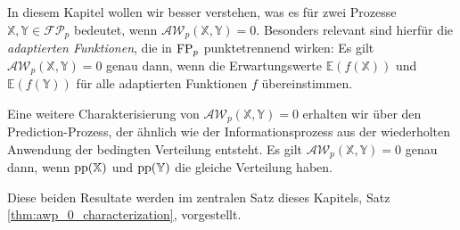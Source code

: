 In diesem Kapitel wollen wir besser verstehen, was es für zwei Prozesse $\mathbb{X,Y} \in \mathcal{FP}_p$ bedeutet, wenn $\mathcal{AW}_p(\mathbb{X,Y}) = 0$. Besonders relevant sind hierfür die \emph{adaptierten Funktionen}, die in $\operatorname{FP}_p$ punktetrennend wirken: Es gilt $\mathcal{AW}_p(\mathbb{X,Y})=0$ genau dann, wenn die Erwartungswerte $\mathbb{E}(f(\mathbb{X}))$ und $\mathbb{E}(f(\mathbb{Y}))$ für alle adaptierten Funktionen $f$ übereinstimmen. 

Eine weitere Charakterisierung von $\mathcal{AW}_p(\mathbb{X,Y})=0$ erhalten wir über den \\ 
Prediction-Prozess, der ähnlich wie der Informationsprozess aus der wiederholten Anwendung der bedingten Verteilung entsteht. Es gilt $\mathcal{AW}_p(\mathbb{X,Y})=0$ genau dann, wenn $\operatorname{pp}(\mathbb{X})$ und $\operatorname{pp}(\mathbb{Y})$ die gleiche Verteilung haben.

Diese beiden Resultate werden im zentralen Satz dieses Kapitels, Satz \ref{thm:awp_0_characterization}, vorgestellt.

